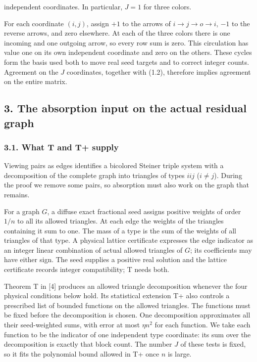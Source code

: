 \documentclass[english,11pt,a4paper]{article}
\begin{document}
independent coordinates. In particular, \(J=1\) for three colors.

For each coordinate \((i,j)\), assign \(+1\) to the arrows of \(i\to j\to o\to i\), \(-1\) to the reverse arrows, and zero elsewhere. At each of the three colors there is one incoming and one outgoing arrow, so every row sum is zero. This circulation has value one on its own independent coordinate and zero on the others. These cycles form the basis used both to move real seed targets and to correct integer counts. Agreement on the \(J\) coordinates, together with (1.2), therefore implies agreement on the entire matrix.

\subsection{3. The absorption input on the actual residual graph}\label{the-absorption-input-on-the-actual-residual-graph}

\subsubsection{3.1. What T and T+ supply}\label{what-t-and-t-supply}

Viewing pairs as edges identifies a bicolored Steiner triple system with a decomposition of the complete graph into triangles of types \(iij\) (\(i\ne j\)). During the proof we remove some pairs, so absorption must also work on the graph that remains.

For a graph \(G\), a diffuse exact fractional seed assigns positive weights of order \(1/n\) to all its allowed triangles. At each edge the weights of the triangles containing it sum to one. The mass of a type is the sum of the weights of all triangles of that type. A physical lattice certificate expresses the edge indicator as an integer linear combination of actual allowed triangles of \(G\); its coefficients may have either sign. The seed supplies a positive real solution and the lattice certificate records integer compatibility; T needs both.

Theorem T in {[}4{]} produces an allowed triangle decomposition whenever the four physical conditions below hold. Its statistical extension T+ also controls a prescribed list of bounded functions on the allowed triangles. The functions must be fixed before the decomposition is chosen. One decomposition approximates all their seed-weighted sums, with error at most \(\eta n^2\) for each function. We take each function to be the indicator of one independent type coordinate: its sum over the decomposition is exactly that block count. The number \(J\) of these tests is fixed, so it fits the polynomial bound allowed in T+ once \(n\) is large.
\end{document}
